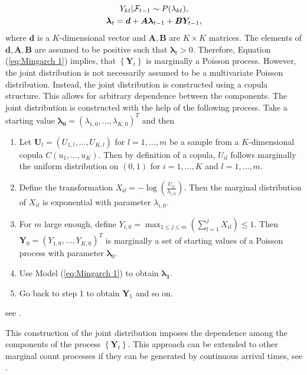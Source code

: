 \begin{equation}
\begin{gathered}
Y_{kt} | \mathcal{F}_{t-1} \sim P(\lambda_{kt}), \\
\bm{\lambda}_t = \bm{d} + \bm{A}\bm{\lambda}_{t-1} + \bm{B}\bm{Y}_{t-1},
\label{eq:Mingarch 1}
\end{gathered}
\end{equation}
%
where $\bm{d}$ is a $K$-dimensional vector and $\bm{A},\bm{B}$ are $K\times K$ matrices. The elements of $\bm{d},\bm{A},\bm{B}$ are assumed to be positive such that $\bm{\lambda}_t > 0$. Therefore, Equation (\ref{eq:Mingarch 1}) implies, that $\left\{\bm{Y}_t\right\}$ is marginally a Poisson process. However, the joint distribution is not necessarily assumed to be a multivariate Poisson distribution. Instead, the joint distribution is constructed using a copula structure. This allows for arbitrary dependence between the components. The joint distribution is constructed with the help of the following process. Take a starting value $\bm{\lambda_0}=(\lambda_{1,0},\ldots,\lambda_{K,0})^T$ and then

\begin{enumerate}
	\item Let $\bm{U}_l=(U_{1,l},\ldots,U_{K,l})$ for $l=1,\ldots,m$ be a sample from a $K$-dimensional copula $C(u_1,\ldots,u_K)$. Then by definition of a copula, $U_{il}$ follows marginally the uniform distribution on $(0,1)$ for $i=1,\ldots,K$ and $l=1,\ldots,m$. 
	\item Define the transformation $X_{il} = -\log (\frac{U_{il}}{\lambda_{i,0}})$. Then the marginal distribution of $X_{il}$ is exponential with parameter $\lambda_{i,0}$. 
	\item For $m$ large enough, define $Y_{i,0} = \max_{1\leq j \leq m}(\sum_{l=1}^j X_{il})\leq 1$. Then $\bm{Y}_0=(Y_{1,0},\ldots,Y_{K,0})^T$ is marginally a set of starting values of a Poisson process with parameter $\bm{\lambda}_0$. 
	\item Use Model (\ref{eq:Mingarch 1}) to obtain $\bm{\lambda_1}$.
	\item Go back to step 1 to obtain $\bm{Y}_1$ and so on. 
\end{enumerate}
%
see \textcite{Fokianos:2020}.

This construction of the joint distribution imposes the dependence among the components of the process $\left\{\bm{Y}_t\right\}$. This approach can be extended to other marginal count processes if they can be generated by continuous arrival times, see \textcite{Fokianos:2020}. 

